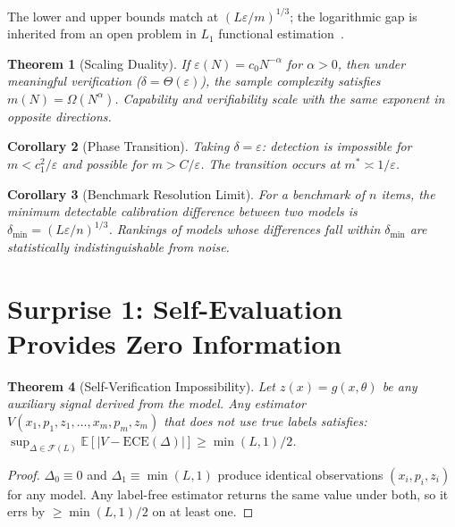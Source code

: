 \documentclass{article}
\newcommand{\ECE}{\mathrm{ECE}}
\newcommand{\cF}{\mathcal{F}}
\newcommand{\Lip}{L}
\newcommand{\errrate}{\varepsilon}
\newcommand{\nsamples}{m}
\newcommand{\calmap}{\Delta}
\providecommand{\E}{}
\renewcommand{\E}{\mathbb{E}}
\newcommand{\targetacc}{\delta}
\newcommand{\modelsize}{N}
\newcommand{\scalingexp}{\alpha}
\newtheorem{theorem}{Theorem}
\newtheorem{corollary}[theorem]{Corollary}
\theoremstyle{definition}
\begin{document}
The lower and upper bounds match at $(\Lip\errrate/\nsamples)^{1/3}$; the logarithmic gap is inherited from an open problem in $L_1$ functional estimation~\citep{lepski1999estimation}.

\begin{theorem}[Scaling Duality]
\label{thm:duality}
If $\errrate(\modelsize) = c_0 \modelsize^{-\scalingexp}$ for $\scalingexp > 0$, then under meaningful verification ($\targetacc = \Theta(\errrate)$), the sample complexity satisfies $\nsamples(\modelsize) = \Omega(\modelsize^\scalingexp)$. Capability and verifiability scale with the same exponent in opposite directions.
\end{theorem}

\begin{corollary}[Phase Transition]
\label{cor:phase-transition}
Taking $\targetacc = \errrate$: detection is impossible for $\nsamples < c_1^2/\errrate$ and possible for $\nsamples > C/\errrate$. The transition occurs at $\nsamples^* \asymp 1/\errrate$.
\end{corollary}

\begin{corollary}[Benchmark Resolution Limit]
\label{cor:resolution}
For a benchmark of $n$ items, the minimum detectable calibration difference between two models is $\targetacc_{\min} = (\Lip\errrate/n)^{1/3}$. Rankings of models whose differences fall within $\targetacc_{\min}$ are statistically indistinguishable from noise.
\end{corollary}

\section{Surprise 1: Self-Evaluation Provides Zero Information}
\label{sec:surprise1}

\begin{theorem}[Self-Verification Impossibility]
\label{thm:selfverify}
Let $z(x) = g(x, \theta)$ be any auxiliary signal derived from the model. Any estimator $V(x_1, p_1, z_1, \ldots, x_\nsamples, p_\nsamples, z_\nsamples)$ that does not use true labels satisfies:
$\sup_{\calmap \in \cF(\Lip)} \E[|V - \ECE(\calmap)|] \geq \min(\Lip, 1)/2$.
\end{theorem}
\begin{proof}
$\calmap_0 \equiv 0$ and $\calmap_1 \equiv \min(\Lip,1)$ produce identical observations $(x_i, p_i, z_i)$ for any model. Any label-free estimator returns the same value under both, so it errs by $\geq \min(\Lip,1)/2$ on at least one.
\end{proof}
\end{document}
